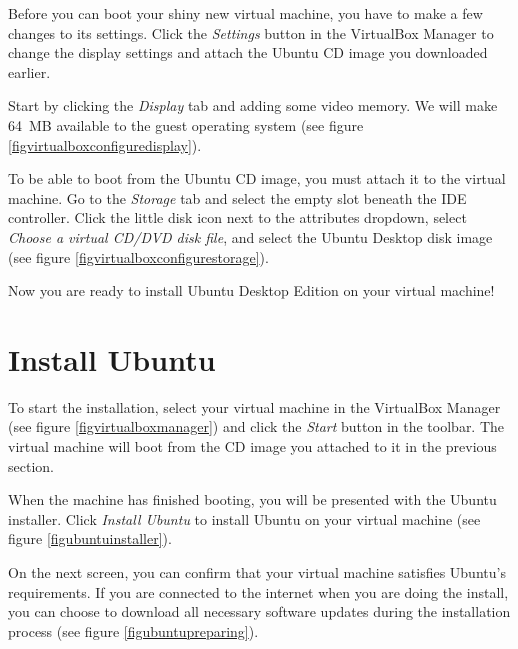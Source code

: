 \documentclass[draft,ebook,10pt,twoside,openright]{memoir}
\begin{document}
Before you can boot your shiny new virtual machine, you have to make a few changes to its settings. Click the \emph{Settings} button in the VirtualBox Manager to change the display settings and attach the Ubuntu CD image you downloaded earlier.

Start by clicking the \emph{Display} tab and adding some video memory. We will make 64~MB available to the guest operating system (see figure \ref{figvirtualboxconfiguredisplay}).


To be able to boot from the Ubuntu CD image, you must attach it to the virtual machine. Go to the \emph{Storage} tab and select the empty slot beneath the IDE controller. Click the little disk icon next to the attributes dropdown, select \emph{Choose a virtual CD/DVD disk file}, and select the Ubuntu Desktop disk image (see figure \ref{figvirtualboxconfigurestorage}).


Now you are ready to install Ubuntu Desktop Edition on your virtual machine!


\section{Install Ubuntu} \label{secinstallubuntu}

To start the installation, select your virtual machine in the VirtualBox Manager (see figure \ref{figvirtualboxmanager}) and click the \emph{Start} button in the toolbar. The virtual machine will boot from the CD image you attached to it in the previous section.


When the machine has finished booting, you will be presented with the Ubuntu installer. Click \emph{Install Ubuntu} to install Ubuntu on your virtual machine (see figure \ref{figubuntuinstaller}).


On the next screen, you can confirm that your virtual machine satisfies Ubuntu's requirements. If you are connected to the internet when you are doing the install, you can choose to download all necessary software updates during the installation process (see figure \ref{figubuntupreparing}).
\end{document}
